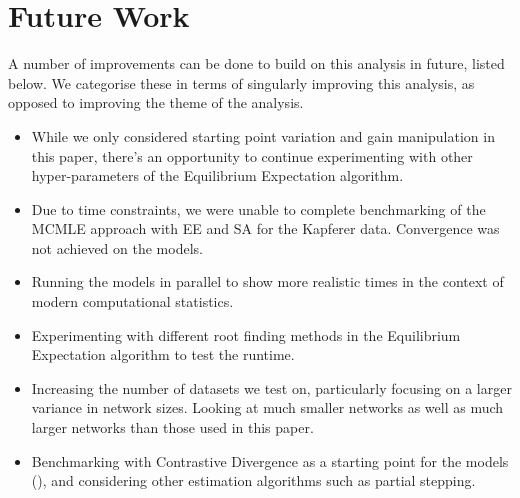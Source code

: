\section{Future Work}
\label{sec:futurework}

A number of improvements can be done to build on this analysis in future, listed below. We categorise these in terms of singularly improving this analysis, as opposed to improving the theme of the analysis.

\begin{itemize}
\item While we only considered starting point variation and gain manipulation in this paper, there's an opportunity to continue experimenting with other hyper-parameters of the Equilibrium Expectation algorithm.
\item Due to time constraints, we were unable to complete benchmarking of the MCMLE approach with EE and SA for the Kapferer data. Convergence was not achieved on the models.
\item Running the models in parallel to show more realistic times in the context of modern computational statistics. 
\item Experimenting with different root finding methods in the Equilibrium Expectation algorithm to test the runtime. 
\item Increasing the number of datasets we test on, particularly focusing on a larger variance in network sizes. Looking at much smaller networks as well as much larger networks than those used in this paper.
\item Benchmarking with Contrastive Divergence as a starting point for the models (\cite{krivitsky2017}), and considering other estimation algorithms such as partial stepping. 
\end{itemize}